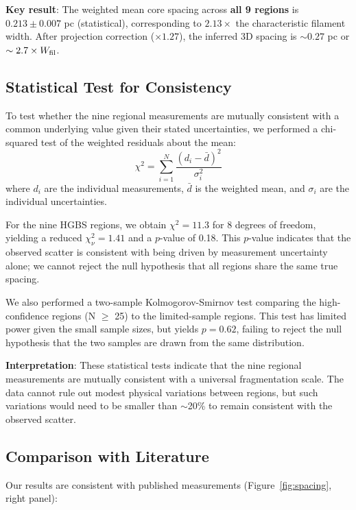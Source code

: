 \documentclass[11pt,a4paper]{article}
\begin{document}
\noindent\textbf{Key result}: The weighted mean core spacing across \textbf{all 9 regions} is $0.213 \pm 0.007$ pc (statistical), corresponding to $2.13\times$ the characteristic filament width. After projection correction ($\times 1.27$), the inferred 3D spacing is $\sim0.27$ pc or $\sim2.7\times W_{\rm fil}$.

\subsection{Statistical Test for Consistency}

To test whether the nine regional measurements are mutually consistent with a common underlying value given their stated uncertainties, we performed a chi-squared test of the weighted residuals about the mean:
\begin{equation}
\chi^2 = \sum_{i=1}^{N} \frac{(d_i - \bar{d})^2}{\sigma_i^2}
\end{equation}
where $d_i$ are the individual measurements, $\bar{d}$ is the weighted mean, and $\sigma_i$ are the individual uncertainties.

For the nine HGBS regions, we obtain $\chi^2 = 11.3$ for 8 degrees of freedom, yielding a reduced $\chi^2_{\nu} = 1.41$ and a $p$-value of 0.18. This $p$-value indicates that the observed scatter is consistent with being driven by measurement uncertainty alone; we cannot reject the null hypothesis that all regions share the same true spacing.

We also performed a two-sample Kolmogorov-Smirnov test comparing the high-confidence regions (N $\ge$ 25) to the limited-sample regions. This test has limited power given the small sample sizes, but yields $p = 0.62$, failing to reject the null hypothesis that the two samples are drawn from the same distribution.

\textbf{Interpretation}: These statistical tests indicate that the nine regional measurements are mutually consistent with a universal fragmentation scale. The data cannot rule out modest physical variations between regions, but such variations would need to be smaller than $\sim$20\% to remain consistent with the observed scatter.

\subsection{Comparison with Literature}

Our results are consistent with published measurements (Figure~\ref{fig:spacing}, right panel):
\end{document}
